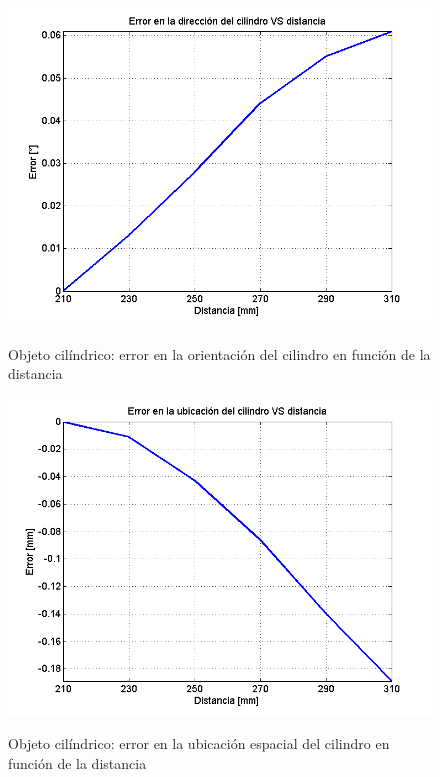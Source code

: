 \begin{figure}[!bth]
    \myfloatalign
        {\includegraphics[width=1.0\linewidth]{scans/plotCylinderDirectionError}}
        \caption{Objeto cilíndrico: error en la orientación del cilindro en función de la distancia}
        \label{fig:cylinderDirectionErrorVsDistance}
\end{figure}

\begin{figure}[!bth]
    \myfloatalign
        {\includegraphics[width=1.0\linewidth]{scans/plotCylinderLocationError}}
        \caption{Objeto cilíndrico: error en la ubicación espacial del cilindro en función de la distancia}
        \label{fig:cylinderLocationErrorVsDistance}
\end{figure}

